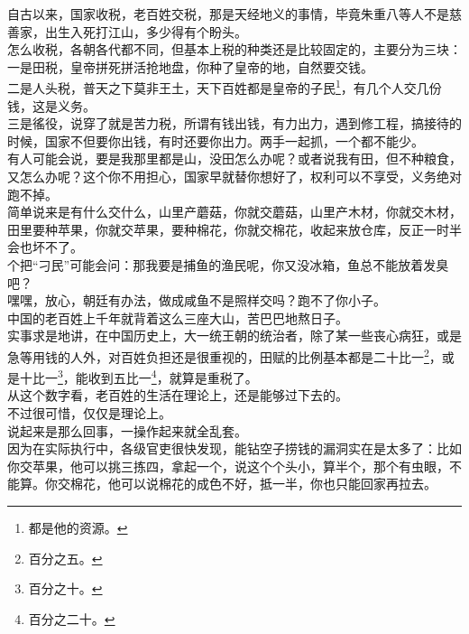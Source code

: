 \begin{multicols}{\theparacolNo}
自古以来，国家收税，老百姓交税，那是天经地义的事情，毕竟朱重八等人不是慈善家，出生入死打江山，多少得有个盼头。\\

怎么收税，各朝各代都不同，但基本上税的种类还是比较固定的，主要分为三块：\\

一是田税，皇帝拼死拼活抢地盘，你种了皇帝的地，自然要交钱。\\

二是人头税，普天之下莫非王土，天下百姓都是皇帝的子民\footnote{都是他的资源。}，有几个人交几份钱，这是义务。\\

三是徭役，说穿了就是苦力税，所谓有钱出钱，有力出力，遇到修工程，搞接待的时候，国家不但要你出钱，有时还要你出力。两手一起抓，一个都不能少。\\

有人可能会说，要是我那里都是山，没田怎么办呢？或者说我有田，但不种粮食，又怎么办呢？这个你不用担心，国家早就替你想好了，权利可以不享受，义务绝对跑不掉。\\

简单说来是有什么交什么，山里产蘑菇，你就交蘑菇，山里产木材，你就交木材，田里要种苹果，你就交苹果，要种棉花，你就交棉花，收起来放仓库，反正一时半会也坏不了。\\

个把“刁民”可能会问：那我要是捕鱼的渔民呢，你又没冰箱，鱼总不能放着发臭吧？\\

嘿嘿，放心，朝廷有办法，做成咸鱼不是照样交吗？跑不了你小子。\\

中国的老百姓上千年就背着这么三座大山，苦巴巴地熬日子。\\

实事求是地讲，在中国历史上，大一统王朝的统治者，除了某一些丧心病狂，或是急等用钱的人外，对百姓负担还是很重视的，田赋的比例基本都是二十比一\footnote{百分之五。}，或是十比一\footnote{百分之十。}，能收到五比一\footnote{百分之二十。}，就算是重税了。\\

从这个数字看，老百姓的生活在理论上，还是能够过下去的。\\

不过很可惜，仅仅是理论上。\\

说起来是那么回事，一操作起来就全乱套。\\

因为在实际执行中，各级官吏很快发现，能钻空子捞钱的漏洞实在是太多了：比如你交苹果，他可以挑三拣四，拿起一个，说这个个头小，算半个，那个有虫眼，不能算。你交棉花，他可以说棉花的成色不好，抵一半，你也只能回家再拉去。\\


\end{multicols}
